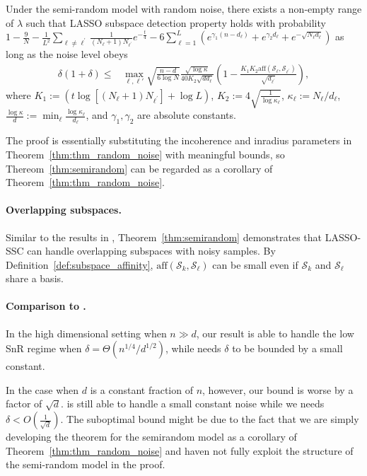 \documentclass[twoside,11pt]{article}
\numberwithin{equation}{section}
\begin{document}
\begin{theorem}\label{thm:semirandom}
Under the semi-random model with random noise, there exists a non-empty range of $\lambda$ such that LASSO subspace detection property holds with probability $1- \frac{9}{N} - \frac{1}{L^2}\sum_{\ell\neq \ell^\prime}\frac{1}{(N_{\ell}+1)N_{\ell^\prime}} e^{-\frac{t}{4}} -6\sum_{\ell=1}^L (e^{\gamma_1 (n-d_\ell)}+e^{\gamma_2 d_\ell}+e^{-\sqrt{N_{\ell}d_{\ell}}})$ as long as the noise level obeys
\begin{align*}
 \delta(1+\delta) \leq& \max_{\ell,\ell'}\sqrt{\frac{n-d}{6\log N}} \frac{\sqrt{\log \kappa}}{40K_2\sqrt{dd_\ell}}\left(1- \frac{K_1K_2 \mathrm{aff}(\mathcal{S}_{\ell},\mathcal{S}_{\ell^\prime})}{\sqrt{ d_{\ell^\prime}}} \right),
\end{align*}
where $K_1:= (t \log  [(N_{\ell}+1)N_{\ell^\prime}] + \log L)$, $K_2 := 4\sqrt{\frac{1}{\log\kappa_\ell}}$, $\kappa_\ell := N_{\ell}/d_{\ell}$, $\frac{\log\kappa}{d} :=\min_{\ell} \frac{\log\kappa_\ell}{d_\ell}$, and
$\gamma_1,\gamma_2$ are absolute constants.
\end{theorem}
The proof is essentially substituting the incoherence and inradius parameters in Theorem~\ref{thm:thm_random_noise} with meaningful bounds, so Thereom~\ref{thm:semirandom} can be regarded as a corollary of Theorem~\ref{thm:thm_random_noise}.

\paragraph{Overlapping subspaces.}
Similar to the results in \citet{soltanolkotabi2011geometric}, Theorem~\ref{thm:semirandom} demonstrates that LASSO-SSC can handle overlapping subspaces with noisy samples. By Definition~\ref{def:subspace_affinity}, $\mathrm{aff}(\mathcal{S}_k,\mathcal{S}_{\ell})$ can be small even if $\mathcal{S}_k$ and $\mathcal{S}_{\ell}$ share a basis.

\paragraph{Comparison to \citet{soltanolkotabi2013robust}.}
In the high dimensional setting when $n\gg d$, our result is able to handle the low SnR regime when $\delta = \Theta(n^{1/4}/d^{1/2})$, while \citet{soltanolkotabi2013robust} needs $\delta$ to be bounded by a small constant.

In the case when $d$ is a constant fraction of $n$, however, our bound is worse by a factor of $\sqrt{d}$. \citet{soltanolkotabi2013robust} is still able to handle a small constant noise while we needs $\delta < O(\frac{1}{\sqrt{d}})$. The suboptimal bound might be due to the fact that we are simply developing the theorem for the semirandom model as a corollary of Theorem~\ref{thm:thm_random_noise} and haven not fully exploit the structure of the semi-random model in the proof.
\end{document}

